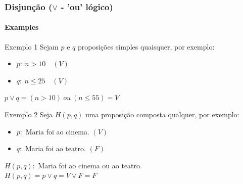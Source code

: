 \documentclass[10pt, headsepline, captions=tableabove, xcolor=table]{beamer}
\begin{document}
%
\begin{frame}[t]
    \frametitle{Disjunção ($\lor$ - 'ou' lógico)}
    \framesubtitle{Examples}
    \begin{exampleblock}{Exemplo 1}
        Sejam $p$ e $q$ proposições simples quaisquer, por exemplo:
        \begin{itemize}
            \item $p:~n > 10 \quad (V)$
            \item $q:~n \leq 25 \quad (V)$
        \end{itemize}
        $p \lor q = (n >10)~ou~(n \leq 55) = V$ \\[2pt]
    \end{exampleblock}
    \begin{exampleblock}{Exemplo 2}
        Seja $H(p,q)$ uma proposição composta qualquer, por exemplo:
        \begin{itemize}
            \item $p:$ Maria foi ao cinema. $(V)$
            \item $q:$ Maria foi ao teatro. $(F)$
        \end{itemize}
        $H(p,q):$ Maria foi ao cinema ou ao teatro. \\[2pt]
        $H(p,q) = p \lor q = V \lor F = F$
    \end{exampleblock}
\end{frame}
%
\end{document}
